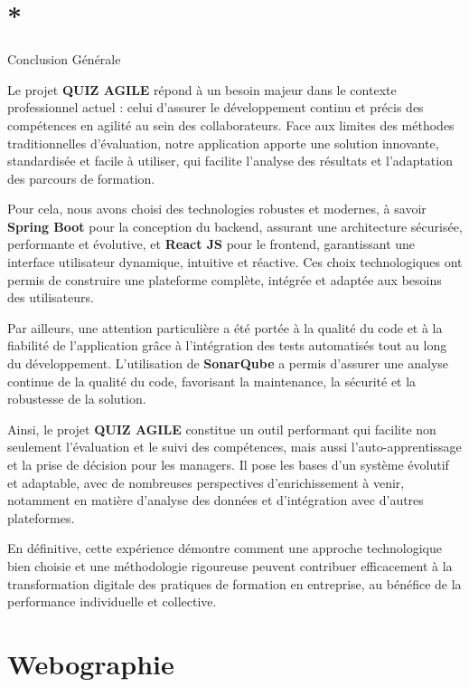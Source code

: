 \documentclass[12pt,a4paper,twoside,openright]{report}
\let\origchapter\chapter
\renewcommand{\chapter}[1]{%
  \cleardoublepage%
  \origchapter{#1}%
}
\begin{document}
\chapter*{Conclusion Générale}

Le projet \textbf{QUIZ AGILE} répond à un besoin majeur dans le contexte
professionnel actuel : celui d'assurer le développement continu et
précis des compétences en agilité au sein des collaborateurs. Face aux
limites des méthodes traditionnelles d'évaluation, notre application
apporte une solution innovante, standardisée et facile à utiliser, qui
facilite l'analyse des résultats et l'adaptation des parcours de
formation.

Pour cela, nous avons choisi des technologies robustes et modernes, à
savoir \textbf{Spring Boot} pour la conception du backend, assurant une
architecture sécurisée, performante et évolutive, et \textbf{React JS}
pour le frontend, garantissant une interface utilisateur dynamique,
intuitive et réactive. Ces choix technologiques ont permis de construire
une plateforme complète, intégrée et adaptée aux besoins des
utilisateurs.

Par ailleurs, une attention particulière a été portée à la qualité du
code et à la fiabilité de l'application grâce à l'intégration des tests
automatisés tout au long du développement. L'utilisation de
\textbf{SonarQube} a permis d'assurer une analyse continue de la qualité
du code, favorisant la maintenance, la sécurité et la robustesse de la
solution.

Ainsi, le projet \textbf{QUIZ AGILE} constitue un outil performant qui
facilite non seulement l'évaluation et le suivi des compétences, mais
aussi l'auto-apprentissage et la prise de décision pour les managers. Il
pose les bases d'un système évolutif et adaptable, avec de nombreuses
perspectives d'enrichissement à venir, notamment en matière d'analyse
des données et d'intégration avec d'autres plateformes.

En définitive, cette expérience démontre comment une approche
technologique bien choisie et une méthodologie rigoureuse peuvent
contribuer efficacement à la transformation digitale des pratiques de
formation en entreprise, au bénéfice de la performance individuelle et
collective.

\newpage
\chapter{Webographie}
\label{ch:webography}
\end{document}

